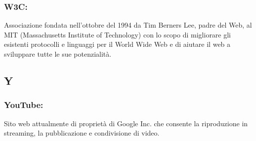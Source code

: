 \subsubsection*{W3C:} Associazione fondata nell'ottobre del 1994 da Tim Berners
Lee, padre del Web, al MIT (Massachusetts Institute of Technology) con lo scopo di migliorare
gli esistenti protocolli e linguaggi per il World Wide Web e di aiutare il web a
sviluppare tutte le sue potenzialit\`a.


\subsection*{\huge{Y}}
\subsubsection*{YouTube:} Sito web attualmente di propriet\`a di Google Inc. che
consente la riproduzione in streaming, la pubblicazione e condivisione di video.





